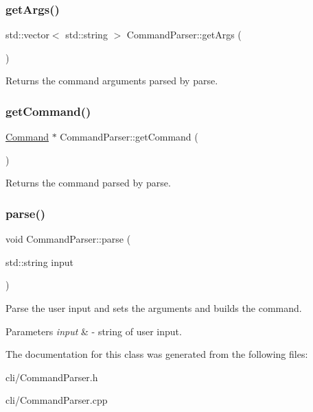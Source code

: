 \subsubsection{\texorpdfstring{get\+Args()}{getArgs()}}
{\footnotesize\ttfamily std\+::vector$<$ std\+::string $>$ Command\+Parser\+::get\+Args (\begin{DoxyParamCaption}{ }\end{DoxyParamCaption})}

Returns the command arguments parsed by {\ttfamily parse}. \mbox{\label{classCommandParser_ab5697cd3e81c17b9963e21a6c135341f}} 
\subsubsection{\texorpdfstring{get\+Command()}{getCommand()}}
{\footnotesize\ttfamily \hyperlink{classCommand}{Command} $\ast$ Command\+Parser\+::get\+Command (\begin{DoxyParamCaption}{ }\end{DoxyParamCaption})}

Returns the command parsed by {\ttfamily parse}. \mbox{\label{classCommandParser_a803c2a599cae6e722c198e6ba3dc9caf}} 
\subsubsection{\texorpdfstring{parse()}{parse()}}
{\footnotesize\ttfamily void Command\+Parser\+::parse (\begin{DoxyParamCaption}\item[{std\+::string}]{input }\end{DoxyParamCaption})}

Parse the user input and sets the arguments and builds the command. 
\begin{DoxyParams}{Parameters}
{\em input} & -\/ string of user input. \\
\hline
\end{DoxyParams}


The documentation for this class was generated from the following files\+:\begin{DoxyCompactItemize}
\item 
cli/Command\+Parser.\+h\item 
cli/Command\+Parser.\+cpp\end{DoxyCompactItemize}
